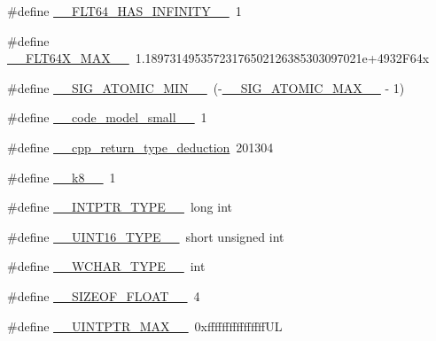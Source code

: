 \begin{DoxyCompactItemize}
\item 
\#define \hyperlink{cmake-build-debug_2babel__client__autogen_2moc__predefs_8h_ac67712f8d687485a4bd1c0b0e2741771}{\+\_\+\+\_\+\+F\+L\+T64\+\_\+\+H\+A\+S\+\_\+\+I\+N\+F\+I\+N\+I\+T\+Y\+\_\+\+\_\+}~1
\item 
\#define \hyperlink{cmake-build-debug_2babel__client__autogen_2moc__predefs_8h_a279ff83df60f2c8ff459cda12dfad97d}{\+\_\+\+\_\+\+F\+L\+T64\+X\+\_\+\+M\+A\+X\+\_\+\+\_\+}~1.\+18973149535723176502126385303097021e+4932\+F64x
\item 
\#define \hyperlink{cmake-build-debug_2babel__client__autogen_2moc__predefs_8h_aa39266a3f430ebcd4a4374e7a815e23f}{\+\_\+\+\_\+\+S\+I\+G\+\_\+\+A\+T\+O\+M\+I\+C\+\_\+\+M\+I\+N\+\_\+\+\_\+}~(-\/\hyperlink{cmake-build-debug_2babel__client__autogen_2moc__predefs_8h_a9e75b72378b039587e4fc4006776826d}{\+\_\+\+\_\+\+S\+I\+G\+\_\+\+A\+T\+O\+M\+I\+C\+\_\+\+M\+A\+X\+\_\+\+\_\+} -\/ 1)
\item 
\#define \hyperlink{cmake-build-debug_2babel__client__autogen_2moc__predefs_8h_ac045b6c5c8c7e9a0208818a2c0b4b2c2}{\+\_\+\+\_\+code\+\_\+model\+\_\+small\+\_\+\+\_\+}~1
\item 
\#define \hyperlink{cmake-build-debug_2babel__client__autogen_2moc__predefs_8h_ac634ecad75dc34e67d161df1d694d892}{\+\_\+\+\_\+cpp\+\_\+return\+\_\+type\+\_\+deduction}~201304
\item 
\#define \hyperlink{cmake-build-debug_2babel__client__autogen_2moc__predefs_8h_a3ee6b6578d683a0e44bc3b4d2a7425e4}{\+\_\+\+\_\+k8\+\_\+\+\_\+}~1
\item 
\#define \hyperlink{cmake-build-debug_2babel__client__autogen_2moc__predefs_8h_a4ca36196b9f45fa67a0b23c43c658aa1}{\+\_\+\+\_\+\+I\+N\+T\+P\+T\+R\+\_\+\+T\+Y\+P\+E\+\_\+\+\_\+}~long int
\item 
\#define \hyperlink{cmake-build-debug_2babel__client__autogen_2moc__predefs_8h_a4c0e7daf2ae663a4f96693468bbb279f}{\+\_\+\+\_\+\+U\+I\+N\+T16\+\_\+\+T\+Y\+P\+E\+\_\+\+\_\+}~short unsigned int
\item 
\#define \hyperlink{cmake-build-debug_2babel__client__autogen_2moc__predefs_8h_a4f41dbe213ea9662c1fb0f5af562e363}{\+\_\+\+\_\+\+W\+C\+H\+A\+R\+\_\+\+T\+Y\+P\+E\+\_\+\+\_\+}~int
\item 
\#define \hyperlink{cmake-build-debug_2babel__client__autogen_2moc__predefs_8h_a4bd7bc94412d84b84388c574770b4549}{\+\_\+\+\_\+\+S\+I\+Z\+E\+O\+F\+\_\+\+F\+L\+O\+A\+T\+\_\+\+\_\+}~4
\item 
\#define \hyperlink{cmake-build-debug_2babel__client__autogen_2moc__predefs_8h_a1a2ed956349884193c07233d3cc40560}{\+\_\+\+\_\+\+U\+I\+N\+T\+P\+T\+R\+\_\+\+M\+A\+X\+\_\+\+\_\+}~0xffffffffffffffff\+UL

\end{DoxyCompactItemize}
